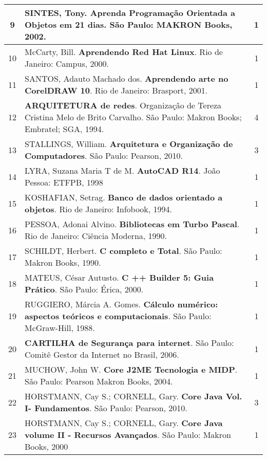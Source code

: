 \begin{longtable}{|c|p{115mm}|c|}
9     & SINTES, Tony. \textbf{Aprenda Programação Orientada a Objetos em 21 dias}. São Paulo: MAKRON Books, 2002. & 1          \\ \hline
10     & McCarty, Bill. \textbf{Aprendendo Red Hat Linux}. Rio de Janeiro: Campus, 2000.       & 1          \\ \hline
11     & SANTOS, Adauto Machado dos. \textbf{Aprendendo arte no CorelDRAW 10}. Rio de Janeiro: Brasport, 2001. & 1          \\ \hline
12     & \textbf{ARQUITETURA de redes}. Organização de Tereza Cristina Melo de Brito Carvalho. São Paulo: Makron Books; Embratel; SGA, 1994. & 4          \\ \hline
13     & STALLINGS, William. \textbf{Arquitetura e Organização de Computadores}. São Paulo: Pearson, 2010. & 3          \\ \hline
14      & LYRA, Suzana Maria T de M. \textbf{AutoCAD R14}. João Pessoa: ETFPB, 1998                      & 1          \\ \hline
15     & KOSHAFIAN, Setrag. \textbf{Banco de dados orientado a objetos}. Rio de Janeiro: Infobook, 1994.& 1          \\ \hline
16     & PESSOA, Adonai Alvino. \textbf{Bibliotecas em Turbo Pascal}. Rio de Janeiro: Ciência Moderna, 1990. & 1          \\ \hline
17     & SCHILDT, Herbert. \textbf{C completo e Total}. São Paulo: Makron Books, 1990.                  & 1          \\ \hline
18     & MATEUS, César Autusto. \textbf{C ++ Builder 5: Guia Prático}. São Paulo: Érica, 2000. & 1          \\ \hline
19      & RUGGIERO, Márcia A. Gomes. \textbf{Cálculo numérico: aspectos teóricos e computacionais}. São Paulo: McGraw-Hill, 1988. & 1          \\ \hline
20     & \textbf{CARTILHA de Segurança para internet}. São Paulo: Comitê Gestor da Internet no Brasil, 2006. & 1          \\ \hline
21     & MUCHOW, John W. \textbf{Core J2ME Tecnologia e MIDP}. São Paulo: Pearson Makron Books, 2004.   & 1          \\ \hline
22     & HORSTMANN, Cay S.; CORNELL, Gary. \textbf{Core Java Vol. I- Fundamentos}. São Paulo: Pearson, 2010. & 3          \\ \hline
23     & HORSTMANN, Cay S.; CORNELL, Gary. \textbf{Core Java volume II - Recursos Avançados}. São Paulo: Makron Books, 2000 & 1          \\ \hline

\end{longtable}
